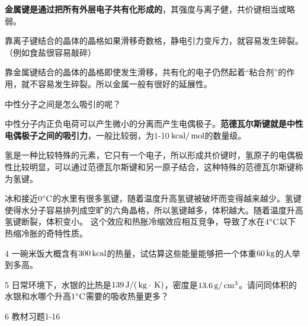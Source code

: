 \documentclass[CJK]{beamer}
\begin{document}
\begin{frame}
\bch

{\bf 金属键是通过把所有外层电子共有化形成的}，其强度与离子健，共价键相当或略弱。

\skipline

靠离子键结合的晶体的晶格如果滑移奇数格，静电引力变斥力，就容易发生碎裂。（例如食盐很容易敲碎）

\skipline

靠金属键结合的晶体的晶格即使发生滑移，共有化的电子仍然起着“粘合剂”的作用，就不容易发生碎裂。所以金属一般有很好的延展性。

\ech
\end{frame}

\begin{frame}
\bch

中性分子之间是怎么吸引的呢？

\skipline

中性分子内正负电荷可以产生微小的分离而产生电偶极子。{\bf 范德瓦尔斯键就是中性电偶极子之间的吸引力}，一般比较弱，为1-10$\,\mathrm{kcal}/\,\mathrm{mol}$的数量级。
\ech
\end{frame}

\begin{frame}
\bch
氢是一种比较特殊的元素，它只有一个电子，所以形成共价键时，氢原子的电偶极性比较明显，可以通过范德瓦尔斯键和另一原子结合，这种特殊的范德瓦尔斯键称为氢键。

\skipline


冰和接近$0^\circ \mathrm{C}$的水里有很多氢键，随着温度升高氢键被破坏而变得越来越少。氢键使得水分子容易排列成空旷的六角晶格，所以氢键越多，体积越大。随着温度升高氢键断裂，体积变小。
这个效应和热胀冷缩效应相互竞争，导致了水在$4^\circ \mathrm{C}$以下热缩冷胀的奇特性质。


\ech
\end{frame}


\begin{frame}
\bch
\bitem
\item[4]{一碗米饭大概含有$300\,\mathrm{kcal}$的热量，试估算这些能量能够把一个体重$60\,\mathrm{kg}$的人举到多高。}
\item[5]{日常环境下，水银的比热是$139 \,\mathrm{J}/(\,\mathrm{kg}\cdot\,\mathrm{K})$，密度是$13.6\,\mathrm{g}/\,\mathrm{cm}^3$。请问同体积的水银和水哪个升高$1^\circ \mathrm{C}$需要的吸收热量更多？}
\item[6]{教材习题1-16}
\eitem
\ech
\end{frame}
\end{document}

